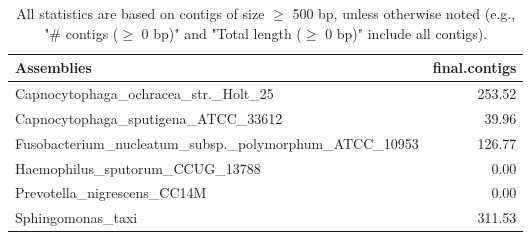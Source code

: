 \documentclass[12pt,a4paper]{article}
\begin{document}
\begin{table}[ht]
\begin{center}
\caption{All statistics are based on contigs of size $\geq$ 500 bp, unless otherwise noted (e.g., "\# contigs ($\geq$ 0 bp)" and "Total length ($\geq$ 0 bp)" include all contigs).}
\begin{tabular}{|l*{1}{|r}|}
\hline
Assemblies & final.contigs \\ \hline
Capnocytophaga\_ochracea\_str.\_Holt\_25 & 253.52 \\ \hline
Capnocytophaga\_sputigena\_ATCC\_33612 & 39.96 \\ \hline
Fusobacterium\_nucleatum\_subsp.\_polymorphum\_ATCC\_10953 & 126.77 \\ \hline
Haemophilus\_sputorum\_CCUG\_13788 & 0.00 \\ \hline
Prevotella\_nigrescens\_CC14M & 0.00 \\ \hline
Sphingomonas\_taxi & 311.53 \\ \hline
\end{tabular}
\end{center}
\end{table}
\end{document}
